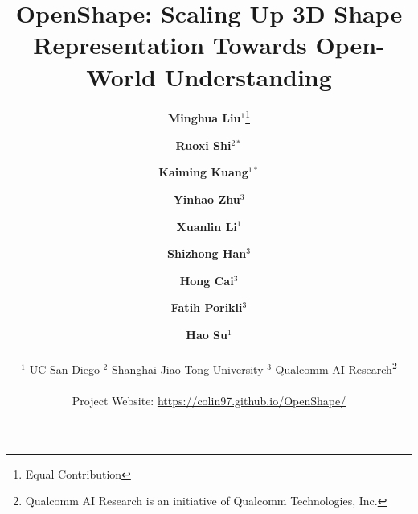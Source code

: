 \documentclass{article}
\title{OpenShape: Scaling Up 3D Shape Representation Towards Open-World Understanding}
\author{%
\textbf{Minghua Liu$^{1}$}\thanks{Equal Contribution}
\and
\textbf{Ruoxi Shi$^{2*}$} \and
\textbf{Kaiming Kuang$^{1*}$} \and
\textbf{Yinhao Zhu$^{3}$} \and
\textbf{Xuanlin Li$^{1}$} \and
\textbf{Shizhong Han$^{3}$} \and
\textbf{Hong Cai$^{3}$} \and
\textbf{Fatih Porikli$^{3}$} \and
\textbf{Hao Su$^{1}$} 
\\
\\
$^{1}$ UC San Diego \quad
$^{2}$ Shanghai Jiao Tong University \quad 
${^3}$ Qualcomm AI Research\thanks{Qualcomm AI Research is an initiative of Qualcomm Technologies, Inc.}
\\
\\
Project Website: \url{https://colin97.github.io/OpenShape/}
}
\begin{document}
\maketitle




 




{


}
\end{document}
